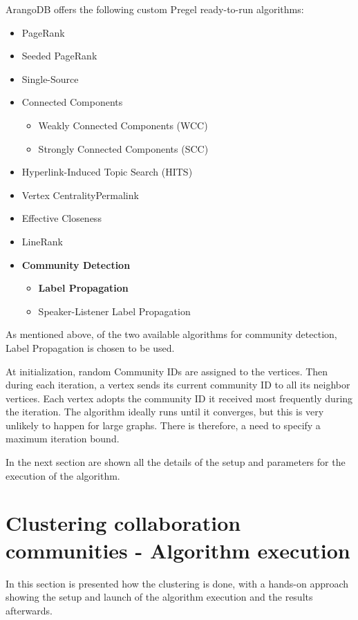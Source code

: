 ArangoDB offers the following custom \gls{Pregel} ready-to-run algorithms:
 \begin{itemize}[noitemsep]
	\item \gls{PageRank}
	\item \gls{Seeded PageRank}
	\item Single-Source 
	\item \gls{Connected Components}
	 \begin{itemize}[noitemsep]
		\item \gls{Weakly Connected Components} (\acrshort{WCC})
		\item \gls{Strongly Connected Components} (\acrshort{SCC})
	\end{itemize}
	\item \gls{Hyperlink-Induced Topic Search} (HITS)
	\item \gls{Vertex CentralityPermalink}
	\item \gls{Effective Closeness}
	\item \gls{LineRank}
	\item \textbf{Community Detection}
	 \begin{itemize}[noitemsep]
		\item \textbf{\gls{Label Propagation}}
		\item \gls{Speaker-Listener Label Propagation}
	\end{itemize}
\end{itemize}

As mentioned above, of the two available algorithms for community detection, Label Propagation is chosen to be used.
\bigskip

At initialization, random Community IDs are assigned to the vertices.
Then during each iteration, a vertex sends its current community ID to all its neighbor vertices.
Each vertex adopts the community ID it received most frequently during the iteration.
The algorithm ideally runs until it converges, but this is very unlikely to happen for large graphs.
There is therefore, a need to specify a maximum iteration bound.

In the next section are shown all the details of the setup and parameters for the execution of the algorithm.

\section{Clustering collaboration communities - Algorithm execution} \label{section:CommunityDetection/ClusteringcollaborationcommunitiesAlgorithmexecution}
In this section is presented how the clustering is done, with a hands-on approach showing the setup and launch of the algorithm execution and the results afterwards.

